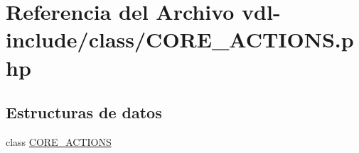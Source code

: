 \hypertarget{CORE__ACTIONS_8php}{\section{Referencia del Archivo vdl-\/include/class/\-C\-O\-R\-E\-\_\-\-A\-C\-T\-I\-O\-N\-S.php}
\label{CORE__ACTIONS_8php}
}
\subsection*{Estructuras de datos}
\begin{DoxyCompactItemize}
\item 
class \hyperlink{classCORE__ACTIONS}{C\-O\-R\-E\-\_\-\-A\-C\-T\-I\-O\-N\-S}
\end{DoxyCompactItemize}
